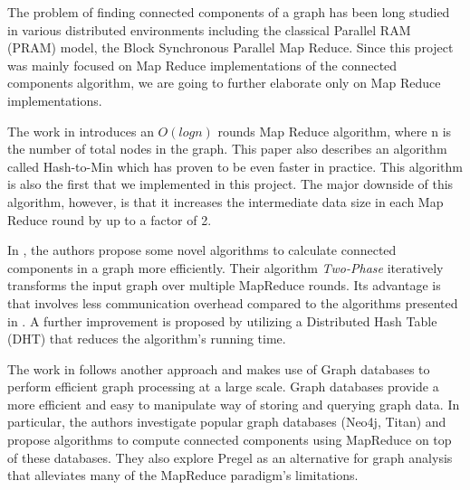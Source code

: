The problem of finding connected components of a graph has been long studied in various distributed environments including the classical Parallel RAM (PRAM) model, the Block Synchronous Parallel Map Reduce. Since this project was mainly focused on Map Reduce implementations of the connected components algorithm, we are going to further elaborate only on Map Reduce implementations.

The work in \cite{rastogi} introduces an $O(logn)$ rounds Map Reduce algorithm, where n is the number of total nodes in the graph. This paper also describes an algorithm called Hash-to-Min which has proven to be even faster in practice. This algorithm is also the first that we implemented in this project. The major downside of this algorithm, however, is that it increases the intermediate data size in each Map Reduce round by up to a factor of 2.

In \cite{kiveris}, the authors propose some novel algorithms to calculate connected components in a graph more efficiently. Their algorithm \textit{Two-Phase} iteratively transforms the input graph over multiple MapReduce rounds. Its advantage is that involves less communication overhead compared to the algorithms presented in \cite{rastogi}. A further improvement is proposed by utilizing a Distributed Hash Table (\ie DHT) that reduces the algorithm's running time. 

The work in \cite{lim2015} follows another approach and makes use of Graph databases to perform efficient graph processing at a large scale. Graph databases provide a more efficient and easy to manipulate way of storing and querying graph data. In particular, the authors investigate popular graph databases (Neo4j, Titan) and propose algorithms to compute connected components using MapReduce on top of these databases. They also explore Pregel \cite{pregel} as an alternative for graph analysis that alleviates many of the MapReduce paradigm's limitations.